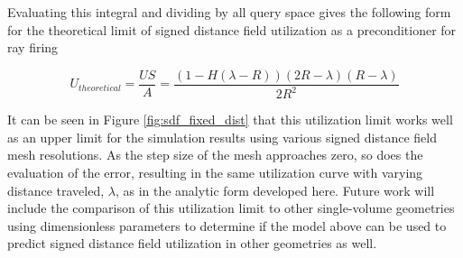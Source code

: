 Evaluating this integral and dividing by all query space gives the
following form for the theoretical limit of signed distance field utilization as a
preconditioner for ray firing

\begin{equation}
U_{theoretical} = \frac{US}{A} =  \frac{(1-H(\lambda-R))(2R-\lambda)(R-\lambda)}{2R^2}
\end{equation}

It can be seen in  Figure \ref{fig:sdf_fixed_dist} that this utilization limit
works well as an upper limit for the simulation results using various signed
distance field mesh resolutions. As the step size of the mesh approaches zero,
so does the evaluation of the error, resulting in the same utilization curve
with varying distance traveled, $\lambda$, as in the analytic form developed
here. Future work will include the comparison of this utilization limit to other
single-volume geometries using dimensionless parameters to determine if the
model above can be used to predict signed distance field utilization in other
geometries as well.





